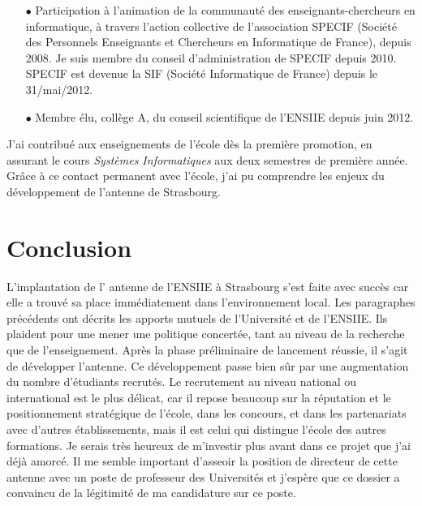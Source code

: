 \documentclass[11pt]{article}
\begin{document}
\begin{itemize}
\item[$\bullet$] 
Participation à l'animation de la communauté des enseignants-chercheurs en informatique, à travers 
l'action collective de l'association SPECIF (Société des Personnels Enseignants et Chercheurs 
en Informatique de France), depuis 2008. Je suis membre du conseil d'administration de SPECIF depuis 
2010. SPECIF est devenue la SIF (Société Informatique de France) depuis le 31/mai/2012.\\

\item[$\bullet$] 
Membre élu, collège A, du conseil scientifique de l'ENSIIE depuis juin 2012. 
\vspace{1cm}
\end{itemize}




J'ai contribué aux enseignements de l'école dès la première promotion,
en assurant le cours \emph{Systèmes Informatiques} aux deux semestres
de première année. Grâce à ce contact permanent avec l'école, j'ai pu
comprendre les enjeux du développement de l'antenne de Strasbourg.



 
\section*{Conclusion}
L'implantation de  l' antenne de l'ENSIIE  à Strasbourg s'est faite  avec succès
car  elle a  trouvé  sa  place immédiatement  dans  l'environnement local.   Les
paragraphes précédents  ont décrits  les apports mutuels  de l'Université  et de
l'ENSIIE. Ils plaident pour une mener une politique concertée, tant au niveau de
la recherche  que de  l'enseignement. Après la  phase préliminaire  de lancement
réussie, il s'agit de développer l'antenne.  Ce développement passe bien sûr par
une  augmentation du  nombre  d'étudiants recrutés.   Le  recrutement au  niveau
national ou  international est le  plus délicat, car  il repose beaucoup  sur la
réputation et  le positionnement stratégique  de l'école, dans les  concours, et
dans  les partenariats  avec  d'autres  établissements, mais  il  est celui  qui
distingue l'école des  autres formations.  Je serais très  heureux de m'investir
plus avant dans ce projet que j'ai déjà amorcé. Il me semble important d'asseoir
la  position de  directeur de  cette  antenne avec  un poste  de professeur  des
Universités  et j'espère  que ce  dossier  a convaincu  de la  légitimité de  ma
candidature sur ce poste.
\end{document}
